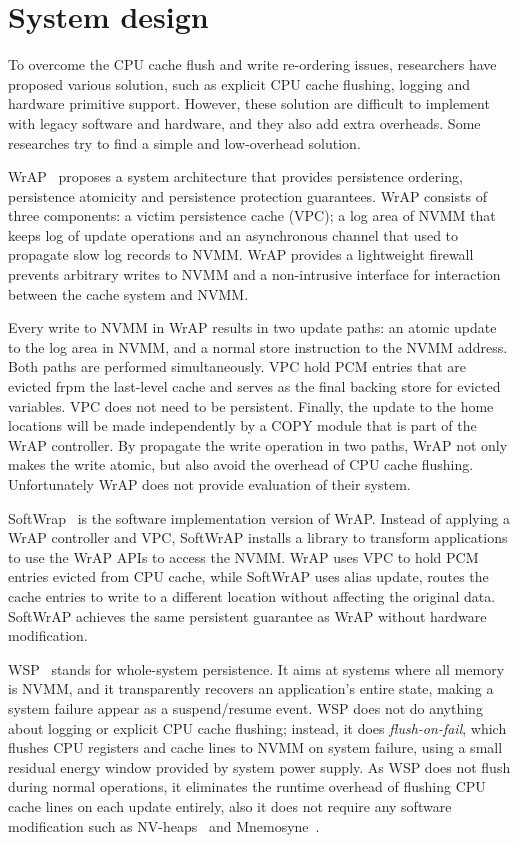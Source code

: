 \section{System design} 
\label{sec:systemdesign}

To overcome the CPU cache flush and write re-ordering issues, researchers
have proposed various solution, such as explicit CPU cache flushing, logging
and hardware primitive support. However, these solution are difficult
to implement with legacy software and hardware, and they also add extra
overheads. Some researches try to find a simple and low-overhead solution.

WrAP~\cite{WrAP} proposes a system architecture that provides persistence
ordering, persistence atomicity and persistence protection guarantees. 
WrAP consists of three components: a victim persistence cache (VPC); a log
area of NVMM that keeps log of update operations and an asynchronous channel
that used to propagate slow log records to NVMM. WrAP provides a lightweight
firewall prevents arbitrary writes to NVMM and a non-intrusive interface
for interaction between the cache system and NVMM.

Every write to NVMM in WrAP results in two update paths: an atomic update to
the log area in NVMM, and a normal store instruction to the NVMM address. Both
paths are performed simultaneously. VPC hold PCM entries that are evicted
frpm the last-level cache and serves as the final backing store for evicted
variables. VPC does not need to be persistent.
Finally, the update to the home locations will be made
independently by a COPY module that is part of the WrAP controller. 
By propagate the write operation in two paths, WrAP not only makes the 
write atomic, but also avoid the overhead of CPU cache flushing.
Unfortunately WrAP does not provide evaluation of their system.

SoftWrap~\cite{softWrAP} is the software implementation version of WrAP.
Instead of applying a WrAP controller and VPC, SoftWrAP installs a library
to transform applications to use the WrAP APIs to access the NVMM. WrAP
uses VPC to hold PCM entries evicted from CPU cache, while SoftWrAP
uses alias update, routes the cache entries to write to a different location
without affecting the original data. SoftWrAP achieves the same persistent
guarantee as WrAP without hardware modification.

WSP~\cite{WSP} stands for whole-system persistence. It aims at systems where
all memory is NVMM, and it transparently recovers an application's entire state,
making a system failure appear as a suspend/resume event. WSP does not
do anything about logging or explicit CPU cache flushing; instead, it does 
\emph{flush-on-fail}, which flushes CPU registers and cache lines to NVMM
on system failure, using a small residual energy window provided by system
power supply. As WSP does not flush during normal operations, it eliminates
the runtime overhead of flushing CPU cache lines on each update entirely, also
it does not require any software modification such as NV-heaps~\cite{nvheaps}
 and Mnemosyne~\cite{mnemosyne}.

